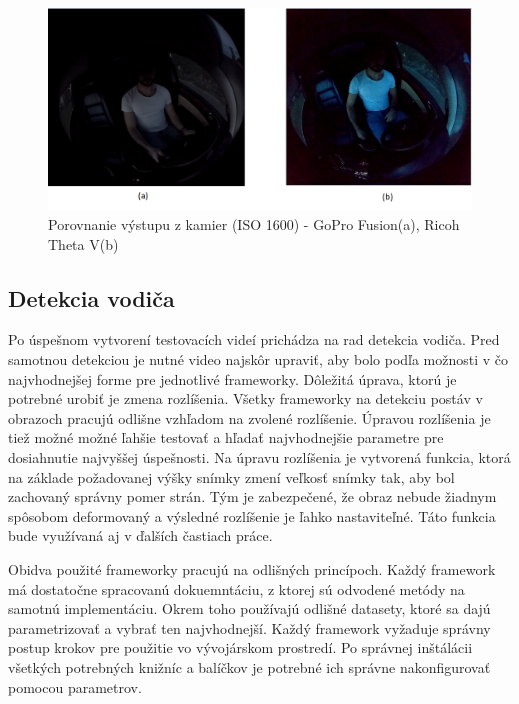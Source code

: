 \documentclass[slovak,master,dept460,male,cpp,cpdeclaration]{diploma}
\begin{document}
\begin{figure}[H]
	\centering
	\includegraphics[width=1\textwidth]{Figures/camCompare.png}
	\caption{Porovnanie výstupu z kamier (ISO 1600) - GoPro Fusion(a), Ricoh Theta V(b)}
	\label{fig:cameraCompare}
\end{figure}



\newpage
\subsection{Detekcia vodiča}
\label{sec:driverDetection}
Po úspešnom vytvorení testovacích videí prichádza na rad detekcia vodiča. Pred samotnou detekciou je nutné video najskôr upraviť, aby bolo podľa možnosti v čo najvhodnejšej forme pre jednotlivé frameworky. Dôležitá úprava, ktorú je potrebné urobiť je zmena rozlíšenia. Všetky frameworky na detekciu postáv v obrazoch pracujú odlišne vzhľadom na zvolené rozlíšenie. Úpravou rozlíšenia je tiež možné možné ľahšie testovať a hľadať najvhodnejšie parametre pre dosiahnutie  najvyššej úspešnosti. Na úpravu rozlíšenia je vytvorená funkcia, ktorá na základe požadovanej výšky  snímky  zmení veľkosť  snímky tak, aby bol zachovaný správny pomer strán. Tým je zabezpečené, že obraz nebude žiadnym spôsobom deformovaný a výsledné rozlíšenie je ľahko nastaviteľné. Táto funkcia bude využívaná aj v ďalších častiach práce.\par
Obidva použité frameworky pracujú na odlišných princípoch.  Každý framework má  dostatočne spracovanú dokuemntáciu, z ktorej sú odvodené metódy na samotnú implementáciu. Okrem toho používajú odlišné datasety, ktoré sa dajú parametrizovať a vybrať ten najvhodnejší. Každý framework  vyžaduje správny postup krokov pre použitie vo vývojárskom prostredí. Po správnej inštálácii všetkých potrebných knižníc a balíčkov  je potrebné ich správne nakonfigurovať pomocou parametrov.
\end{document}

